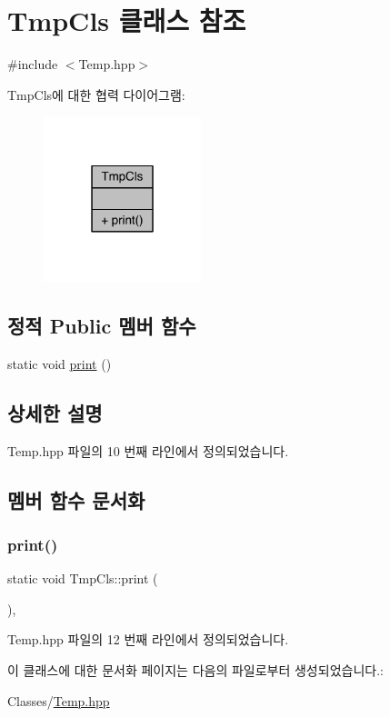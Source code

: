 \hypertarget{class_tmp_cls}{}\section{Tmp\+Cls 클래스 참조}
\label{class_tmp_cls}


{\ttfamily \#include $<$Temp.\+hpp$>$}



Tmp\+Cls에 대한 협력 다이어그램\+:
\nopagebreak
\begin{figure}[H]
\begin{center}
\leavevmode
\includegraphics[width=130pt]{class_tmp_cls__coll__graph}
\end{center}
\end{figure}
\subsection*{정적 Public 멤버 함수}
\begin{DoxyCompactItemize}
\item 
static void \hyperlink{class_tmp_cls_a1f0f7804e9a13c4a3e34f697ec2a49d5}{print} ()
\end{DoxyCompactItemize}


\subsection{상세한 설명}


Temp.\+hpp 파일의 10 번째 라인에서 정의되었습니다.



\subsection{멤버 함수 문서화}
\mbox{\label{class_tmp_cls_a1f0f7804e9a13c4a3e34f697ec2a49d5}} 
\subsubsection{\texorpdfstring{print()}{print()}}
{\footnotesize\ttfamily static void Tmp\+Cls\+::print (\begin{DoxyParamCaption}{ }\end{DoxyParamCaption})\hspace{0.3cm}{\ttfamily [inline]}, {\ttfamily [static]}}



Temp.\+hpp 파일의 12 번째 라인에서 정의되었습니다.



이 클래스에 대한 문서화 페이지는 다음의 파일로부터 생성되었습니다.\+:\begin{DoxyCompactItemize}
\item 
Classes/\hyperlink{_temp_8hpp}{Temp.\+hpp}\end{DoxyCompactItemize}
